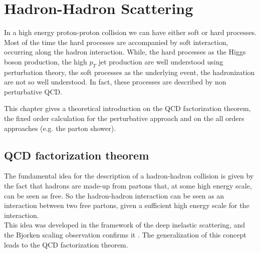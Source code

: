 %
%
%

%


\chapter{Hadron-Hadron Scattering}
\label{chap:Hadron-HadronScattering}

In a high energy proton-proton collision we can have either soft or hard processes. Most of the time the hard processes are accompanied by soft interaction, occurring along the hadron interaction.
While, the hard processes as the Higgs boson production, the high $p_T$ jet production are well understood using perturbation theory, the soft processes as the underlying event, the hadronization are not so well understood. In fact, these processes are described by non perturbative QCD. 

This chapter gives a theoretical introduction on the QCD factorization theorem, the fixed order calculation for the perturbative approach and on the all orders approaches (e.g. the parton shower).

\section{QCD factorization theorem}

The fundamental idea for the description of a hadron-hadron collision is given by the fact that hadrons are made-up from partons that, at some high energy scale, can be seen as free. So the hadron-hadron interaction can be seen as an interaction between two free partons, given a sufficient high energy scale for the interaction.\\
This idea was developed in the framework of the deep inelastic scattering, and the Bjorken scaling observation confirms it \cite{Bjorken:1968dy}. The generalization of this concept leads to the QCD factorization theorem. 
   
